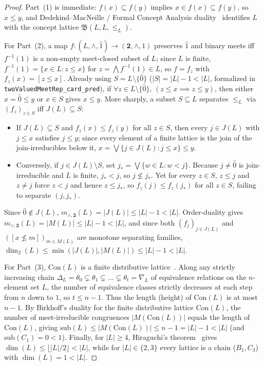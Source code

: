 \documentclass[11pt]{article}
\theoremstyle{definition}
\theoremstyle{remark}
\newcommand{\Con}{\mathrm{Con}}
\newcommand{\BoolTwo}{\mathbf{2}}
\begin{document}
\begin{proof}
Part~(1) is immediate: $f(x) \subseteq f(y)$ implies $x \in f(x) \subseteq f(y)$, so $x \le y$, and Dedekind--MacNeille / Formal Concept Analysis duality~\cite{GanterWille1999} identifies $L$ with the concept lattice $\mathfrak{B}(L,L,{\le_L})$.

For Part~(2), a map $f \colon (L, \wedge, \hat{1}) \to (\BoolTwo, \wedge, 1)$ preserves $\hat{1}$ and binary meets iff $f^{-1}(1)$ is a non-empty meet-closed subset of $L$; since $L$ is finite, $f^{-1}(1) = \{x \in L : z \le x\}$ for $z = \bigwedge f^{-1}(1) \in L$, so $f = f_z$ with $f_z(x) = [z \le x]$. Already using $S = L \setminus \{\hat{0}\}$ ($|S| = |L|-1 < |L|$, formalized in \texttt{twoValuedMeetRep\_card\_pred}), if $\forall z \in L \setminus \{\hat{0}\},\, (z \le x \implies z \le y)$, then either $x = \hat{0} \le y$ or $x \in S$ gives $x \le y$. More sharply, a subset $S \subseteq L$ separates $\le_L$ via $(f_z)_{z \in S}$ iff $J(L) \subseteq S$:
\begin{itemize}
\item If $J(L) \subseteq S$ and $f_z(x) \le f_z(y)$ for all $z \in S$, then every $j \in J(L)$ with $j \le x$ satisfies $j \le y$; since every element of a finite lattice is the join of the join-irreducibles below it, $x = \bigvee \{j \in J(L) : j \le x\} \le y$.
\item Conversely, if $j \in J(L) \setminus S$, set $j_\ast = \bigvee \{w \in L : w < j\}$. Because $j \neq \hat{0}$ is join-irreducible and $L$ is finite, $j_\ast < j$, so $j \not\le j_\ast$. Yet for every $z \in S$, $z \le j$ and $z \neq j$ force $z < j$ and hence $z \le j_\ast$, so $f_z(j) \le f_z(j_\ast)$ for all $z \in S$, failing to separate $(j, j_\ast)$.
\end{itemize}
Since $\hat{0} \notin J(L)$, $m_{\wedge,\BoolTwo}(L) = |J(L)| \le |L|-1 < |L|$. Order-duality gives $m_{\vee,\BoolTwo}(L) = |M(L)| \le |L|-1 < |L|$, and since both $(f_j)_{j \in J(L)}$ and $([x \not\le m])_{m \in M(L)}$ are monotone separating families, $\dim_2(L) \le \min(|J(L)|,|M(L)|) \le |L|-1 < |L|$.

For Part~(3), $\Con(L)$ is a finite distributive lattice~\cite{FunayamaNakayama1942}. Along any strictly increasing chain $\Delta_L = \theta_0 \subsetneq \theta_1 \subsetneq \dots \subsetneq \theta_t = \nabla_L$ of equivalence relations on the $n$-element set $L$, the number of equivalence classes strictly decreases at each step from $n$ down to $1$, so $t \le n - 1$. Thus the length (height) of $\Con(L)$ is at most $n - 1$. By Birkhoff's duality for the finite distributive lattice $\Con(L)$, the number of meet-irreducible congruences $|M(\Con(L))|$ equals the length of $\Con(L)$, giving $\mathrm{sub}(L) \le |M(\Con(L))| \le n - 1 = |L| - 1 < |L|$ (and $\mathrm{sub}(C_1) = 0 < 1$). Finally, for $|L| \ge 4$, Hiraguchi's theorem~\cite{Hiraguchi1951} gives $\dim(L) \le \lfloor |L|/2 \rfloor < |L|$, while for $|L| \in \{2,3\}$ every lattice is a chain ($B_1, C_3$) with $\dim(L) = 1 < |L|$.
\end{proof}
\end{document}
